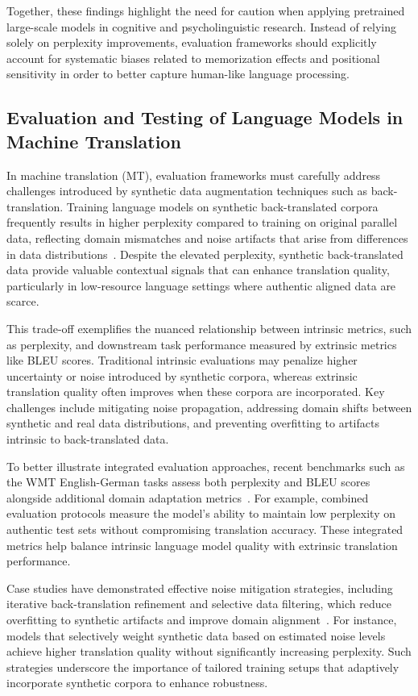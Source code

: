 \documentclass[sigconf]{acmart}
\begin{document}
Together, these findings highlight the need for caution when applying pretrained large-scale models in cognitive and psycholinguistic research. Instead of relying solely on perplexity improvements, evaluation frameworks should explicitly account for systematic biases related to memorization effects and positional sensitivity in order to better capture human-like language processing.

\subsection{Evaluation and Testing of Language Models in Machine Translation}

In machine translation (MT), evaluation frameworks must carefully address challenges introduced by synthetic data augmentation techniques such as back-translation. Training language models on synthetic back-translated corpora frequently results in higher perplexity compared to training on original parallel data, reflecting domain mismatches and noise artifacts that arise from differences in data distributions~\cite{ref37}. Despite the elevated perplexity, synthetic back-translated data provide valuable contextual signals that can enhance translation quality, particularly in low-resource language settings where authentic aligned data are scarce.

This trade-off exemplifies the nuanced relationship between intrinsic metrics, such as perplexity, and downstream task performance measured by extrinsic metrics like BLEU scores. Traditional intrinsic evaluations may penalize higher uncertainty or noise introduced by synthetic corpora, whereas extrinsic translation quality often improves when these corpora are incorporated. Key challenges include mitigating noise propagation, addressing domain shifts between synthetic and real data distributions, and preventing overfitting to artifacts intrinsic to back-translated data.

To better illustrate integrated evaluation approaches, recent benchmarks such as the WMT English-German tasks assess both perplexity and BLEU scores alongside additional domain adaptation metrics~\cite{ref37}. For example, combined evaluation protocols measure the model's ability to maintain low perplexity on authentic test sets without compromising translation accuracy. These integrated metrics help balance intrinsic language model quality with extrinsic translation performance.

Case studies have demonstrated effective noise mitigation strategies, including iterative back-translation refinement and selective data filtering, which reduce overfitting to synthetic artifacts and improve domain alignment~\cite{ref37}. For instance, models that selectively weight synthetic data based on estimated noise levels achieve higher translation quality without significantly increasing perplexity. Such strategies underscore the importance of tailored training setups that adaptively incorporate synthetic corpora to enhance robustness.
\end{document}
